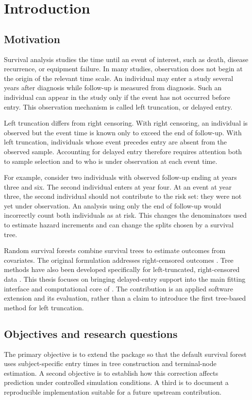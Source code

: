 \chapter{Introduction}
\section{Motivation}
Survival analysis studies the time until an event of interest, such as death,
disease recurrence, or equipment failure. In many studies, observation does not
begin at the origin of the relevant time scale. An individual may enter a study
several years after diagnosis while follow-up is measured from diagnosis.
Such an individual can appear in the study only if the event has not occurred
before entry. This observation mechanism is called left truncation, or delayed
entry.

Left truncation differs from right censoring. With right censoring, an
individual is observed but the event time is known only to exceed the end of
follow-up. With left truncation, individuals whose event precedes entry are
absent from the observed sample. Accounting for delayed entry therefore
requires attention both to sample selection and to who is under observation
at each event time.

For example, consider two individuals with observed follow-up ending at years
three and six. The second individual enters at year four. At an event at year
three, the second individual should not contribute to the risk set: they were
not yet under observation. An analysis using only the end of follow-up would
incorrectly count both individuals as at risk. This changes the denominators
used to estimate hazard increments and can change the splits chosen by a
survival tree.

Random survival forests combine survival trees to estimate outcomes from
covariates. The original formulation addresses right-censored outcomes
\citep{ishwaran2008}. Tree methods have also been developed specifically for
left-truncated, right-censored data \citep{fu2017}. This thesis focuses on
bringing delayed-entry support into the main fitting interface and
computational core of \pkg{}. The contribution is an applied software
extension and its evaluation, rather than a claim to introduce the first
tree-based method for left truncation.

\section{Objectives and research questions}
The primary objective is to extend the package so that the default survival
forest uses subject-specific entry times in tree construction and terminal-node
estimation. A second objective is to establish how this correction affects
prediction under controlled simulation conditions. A third is to document a
reproducible implementation suitable for a future upstream contribution.

